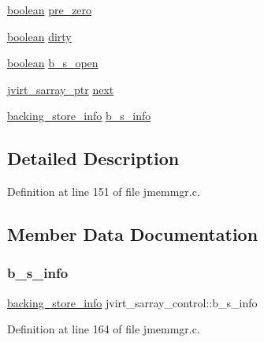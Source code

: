 \begin{DoxyCompactItemize}
\item 
\mbox{\hyperlink{jmorecfg_8h_a7c6368b321bd9acd0149b030bb8275ed}{boolean}} \mbox{\hyperlink{structjvirt__sarray__control_a59c4935ba4bbb52f9c72350a0eab41ce}{pre\+\_\+zero}}
\item 
\mbox{\hyperlink{jmorecfg_8h_a7c6368b321bd9acd0149b030bb8275ed}{boolean}} \mbox{\hyperlink{structjvirt__sarray__control_acfe3e74075a76da809b46b43051eeb83}{dirty}}
\item 
\mbox{\hyperlink{jmorecfg_8h_a7c6368b321bd9acd0149b030bb8275ed}{boolean}} \mbox{\hyperlink{structjvirt__sarray__control_ac40cfb14df1aba304add14c5efde3594}{b\+\_\+s\+\_\+open}}
\item 
\mbox{\hyperlink{jpeglib_8h_abc0b975077507c35b5a577e3ce9e4d91}{jvirt\+\_\+sarray\+\_\+ptr}} \mbox{\hyperlink{structjvirt__sarray__control_aed2d873c89cff97caf93e77b279bdecb}{next}}
\item 
\mbox{\hyperlink{jmemsys_8h_a053e143ffd76dfe3b362c09f7019ea93}{backing\+\_\+store\+\_\+info}} \mbox{\hyperlink{structjvirt__sarray__control_ab5aaaed7f94dc70e0331855bdd6d4972}{b\+\_\+s\+\_\+info}}
\end{DoxyCompactItemize}


\subsection{Detailed Description}


Definition at line 151 of file jmemmgr.\+c.



\subsection{Member Data Documentation}
\mbox{\label{structjvirt__sarray__control_ab5aaaed7f94dc70e0331855bdd6d4972}} 
\subsubsection{\texorpdfstring{b\_s\_info}{b\_s\_info}}
{\footnotesize\ttfamily \mbox{\hyperlink{jmemsys_8h_a053e143ffd76dfe3b362c09f7019ea93}{backing\+\_\+store\+\_\+info}} jvirt\+\_\+sarray\+\_\+control\+::b\+\_\+s\+\_\+info}



Definition at line 164 of file jmemmgr.\+c.

